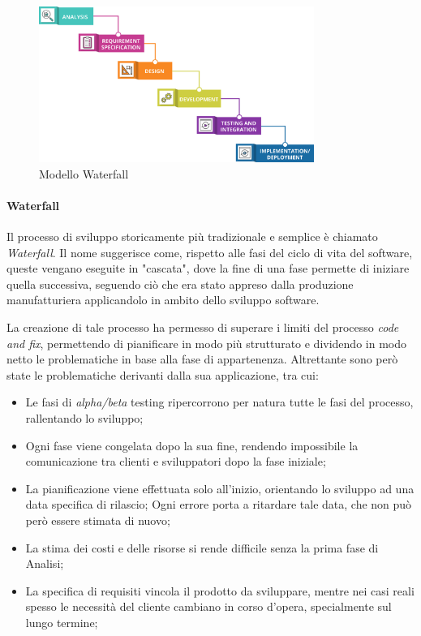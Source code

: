 \documentclass[a4paper,12pt]{report}
\begin{document}
				\begin{figure}[h]
					\centering
					\includegraphics[width=0.8\textwidth]{waterfall}
					\caption{Modello Waterfall}
					\label{fig:waterfall}
				\end{figure}
				
				\paragraph{Waterfall}
				Il processo di sviluppo storicamente più tradizionale e semplice è chiamato \emph{Waterfall}.
				Il nome suggerisce come, rispetto alle fasi del ciclo di vita del software, queste vengano eseguite in "cascata", dove la fine di una fase permette di iniziare quella successiva, seguendo ciò che era stato appreso dalla produzione manufatturiera applicandolo in ambito dello sviluppo software.
				
				\vspace{5mm}
				La creazione di tale processo ha permesso di superare i limiti del processo \emph{code and fix}, permettendo di pianificare in modo più strutturato e dividendo in modo netto le problematiche in base alla fase di appartenenza.
				Altrettante sono però state le problematiche derivanti dalla sua applicazione, tra cui:
				\begin{itemize}
					\item Le fasi di \emph{alpha/beta} testing ripercorrono per natura tutte le fasi del processo, rallentando lo sviluppo;
					\item Ogni fase viene congelata dopo la sua fine, rendendo impossibile la comunicazione tra clienti e sviluppatori dopo la fase iniziale;
					\item La pianificazione viene effettuata solo all'inizio, orientando lo sviluppo ad una data specifica di rilascio; Ogni errore porta a ritardare tale data, che non può però essere stimata di nuovo;
					\item La stima dei costi e delle risorse si rende difficile senza la prima fase di Analisi;
					\item La specifica di requisiti vincola il prodotto da sviluppare, mentre nei casi reali spesso le necessità del cliente cambiano in corso d'opera, specialmente sul lungo termine;
				\end{itemize}
	
\end{document}
